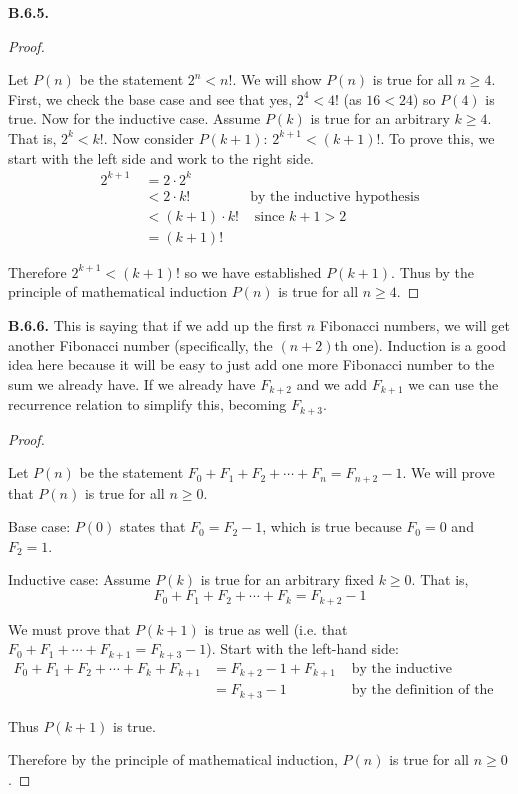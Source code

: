 \documentclass[10pt,]{book}
\theoremstyle{plain}
\theoremstyle{definition}
\theoremstyle{definition}
\theoremstyle{definition}
\theoremstyle{definition}
\numberwithin{equation}{chapter}
\newcommand{\lt}{<}
\newcommand{\gt}{>}
\newcommand{\amp}{&}
\begin{document}
\noindent\textbf{B.6.5.} \begin{proof}\hypertarget{proof-45}{}
\hypertarget{p-2161}{}%
Let \(P(n)\) be the statement \(2^n \lt  n!\). We will show \(P(n)\) is true for all \(n \ge 4\). First, we check the base case and see that yes, \(2^4 \lt  4!\) (as \(16 \lt  24\)) so \(P(4)\) is true. Now for the inductive case. Assume \(P(k)\) is true for an arbitrary \(k \ge 4\). That is, \(2^k \lt  k!\). Now consider \(P(k+1)\): \(2^{k+1} \lt  (k+1)!\). To prove this, we start with the left side and work to the right side.%
\begin{align*}
2^{k+1}~ \amp = 2\cdot 2^k \amp\\
\amp \lt 2\cdot k! \amp \text{by the inductive hypothesis}\\
\amp \lt (k+1) \cdot k! \amp \text{ since } k+1 \gt 2\\
\amp = (k+1)! \amp
\end{align*}
%
\par
\hypertarget{p-2162}{}%
Therefore \(2^{k+1} \lt  (k+1)!\) so we have established \(P(k+1)\). Thus by the principle of mathematical induction \(P(n)\) is true for all \(n \ge 4\).%
\end{proof}
\par\smallskip
\noindent\textbf{B.6.6.} \hypertarget{p-2164}{}%
This is saying that if we add up the first \(n\) Fibonacci numbers, we will get another Fibonacci number (specifically, the \((n+2)\)th one). Induction is a good idea here because it will be easy to just add one more Fibonacci number to the sum we already have. If we already have \(F_{k+2}\) and we add \(F_{k+1}\) we can use the recurrence relation to simplify this, becoming \(F_{k+3}\).%
\begin{proof}\hypertarget{proof-46}{}
\hypertarget{p-2165}{}%
Let \(P(n)\) be the statement \(F_0 + F_1 + F_2 + \cdots + F_n = F_{n+2} - 1\). We will prove that \(P(n)\) is true for all \(n \ge 0\).%
\par
\hypertarget{p-2166}{}%
Base case: \(P(0)\) states that \(F_0 = F_2 - 1\), which is true because \(F_0 = 0\) and \(F_2 = 1\).%
\par
\hypertarget{p-2167}{}%
Inductive case: Assume \(P(k)\) is true for an arbitrary fixed \(k \ge 0\). That is,%
\begin{equation*}
F_0 + F_1 + F_2 + \cdots + F_k = F_{k+2} - 1
\end{equation*}
%
\par
\hypertarget{p-2168}{}%
We must prove that \(P(k+1)\) is true as well (i.e. that \(F_0 + F_1 + \cdots +F_{k+1} = F_{k+3} - 1\)). Start with the left-hand side:%
\begin{align*}
F_0 + F_1 + F_2 + \cdots + F_k + F_{k+1} \amp = F_{k+2} - 1 + F_{k+1} \amp \mbox{ by the inductive hypothesis}\\
\amp = F_{k+3} - 1 \amp \mbox{ by the definition of the Fibonacci numbers}
\end{align*}
%
\par
\hypertarget{p-2169}{}%
Thus \(P(k+1)\) is true.%
\par
\hypertarget{p-2170}{}%
Therefore by the principle of mathematical induction, \(P(n)\) is true for all \(n \ge 0\).%
\end{proof}
\end{document}
